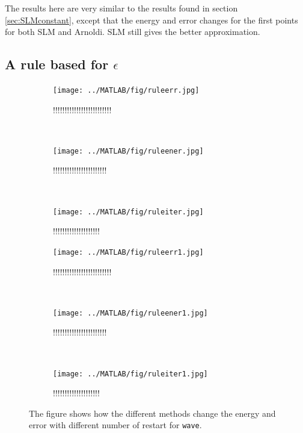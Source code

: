The results here are very similar to the results found in section \ref{sec:SLMconstant}, except that the energy and error changes for the first points for both SLM and Arnoldi. SLM still gives the better approximation.

\subsection{A rule based for $\epsilon$}

\begin{figure}[H]
        \centering
        
        \begin{subfigure}[b]{0.3\textwidth}
                \texttt{[image: ../MATLAB/fig/ruleerr.jpg]}
                \caption{ !!!!!!!!!!!!!!!!!!!!!!!!! }
                \label{fig:ruleerr}
        \end{subfigure}
        ~
        \begin{subfigure}[b]{0.3\textwidth}
                \texttt{[image: ../MATLAB/fig/ruleener.jpg]}
                \caption{ !!!!!!!!!!!!!!!!!!!!!!! }
                \label{fig:ruleener}
        \end{subfigure}
        ~
        \begin{subfigure}[b]{0.3\textwidth}
                \texttt{[image: ../MATLAB/fig/ruleiter.jpg]}
                \caption{ !!!!!!!!!!!!!!!!!!!!  }
                \label{fig:ruleiter}
        \end{subfigure}
        
		\begin{subfigure}[b]{0.3\textwidth}
                \texttt{[image: ../MATLAB/fig/ruleerr1.jpg]}
                \caption{ !!!!!!!!!!!!!!!!!!!!!!!!! }
                \label{fig:ruleerr1}
        \end{subfigure}
        ~
        \begin{subfigure}[b]{0.3\textwidth}
                \texttt{[image: ../MATLAB/fig/ruleener1.jpg]}
                \caption{ !!!!!!!!!!!!!!!!!!!!!!! }
                \label{fig:ruleener1}
        \end{subfigure}
        ~
        \begin{subfigure}[b]{0.3\textwidth}
                \texttt{[image: ../MATLAB/fig/ruleiter1.jpg]}
                \caption{ !!!!!!!!!!!!!!!!!!!!  }
                \label{fig:ruleiter1}
        \end{subfigure}
        \caption{ The figure shows how the different methods change the energy and error with different number of restart for \texttt{wave}.  }
        \label{fig:rule}
\end{figure}

